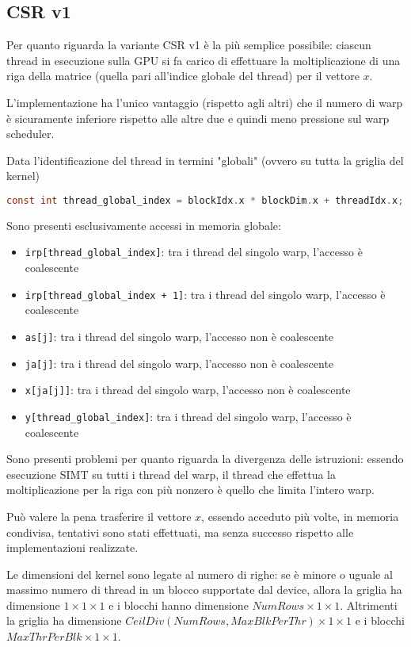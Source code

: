 \documentclass[9pt]{extarticle}
\begin{document}
\subsection{CSR v1}
Per quanto riguarda la variante CSR v1 è la più semplice possibile: ciascun thread in esecuzione sulla GPU si fa carico
di effettuare la moltiplicazione di una riga della matrice (quella pari all'indice globale del thread) per il vettore
$x$.

L'implementazione ha l'unico vantaggio (rispetto agli altri)
che il numero di warp è sicuramente inferiore rispetto alle altre due e quindi meno pressione sul warp scheduler.

Data l'identificazione del thread in termini "globali" (ovvero su tutta la griglia del kernel)
\begin{lstlisting}[language=C]
const int thread_global_index = blockIdx.x * blockDim.x + threadIdx.x;
\end{lstlisting}

Sono presenti esclusivamente accessi in memoria globale:
\begin{itemize}
	\item \texttt{irp[thread\_global\_index]}: tra i thread del singolo warp, l'accesso è coalescente
	\item \texttt{irp[thread\_global\_index + 1]}: tra i thread del singolo warp, l'accesso è coalescente
	\item \texttt{as[j]}: tra i thread del singolo warp, l'accesso non è coalescente
	\item \texttt{ja[j]}: tra i thread del singolo warp, l'accesso non è coalescente
	\item \texttt{x[ja[j]]}: tra i thread del singolo warp, l'accesso non è coalescente
	\item \texttt{y[thread\_global\_index]}: tra i thread del singolo warp, l'accesso è coalescente
\end{itemize}

Sono presenti problemi per quanto riguarda la divergenza delle istruzioni: essendo esecuzione SIMT su tutti i thread del
warp, il thread che effettua la moltiplicazione per la riga con più nonzero è quello che limita l'intero warp.

Può valere la pena trasferire il vettore $x$, essendo acceduto più volte, in memoria condivisa, tentativi sono stati
effettuati, ma senza successo rispetto alle implementazioni realizzate.

Le dimensioni del kernel sono legate al numero di righe: se è minore o uguale al massimo numero di thread in un blocco
supportate dal device, allora la griglia ha dimensione $1\times1\times1$ e i blocchi hanno dimensione 
$NumRows\times1\times1$. Altrimenti la griglia ha dimensione $CeilDiv(NumRows,MaxBlkPerThr)\times1\times1$ e i blocchi
$MaxThrPerBlk\times1\times1$. 
\end{document}
